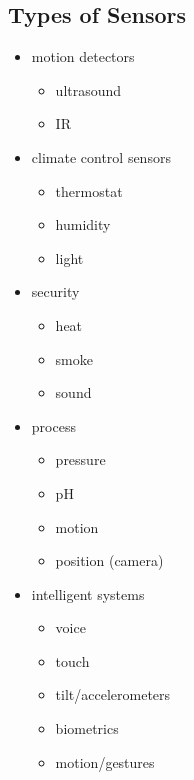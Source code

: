 \documentclass[11pt]{article}
\begin{document}
\subsection{Types of Sensors}
\label{sec:orgc3e558c}
\begin{itemize}
\item motion detectors
\begin{itemize}
\item ultrasound
\item IR
\end{itemize}
\item climate control sensors
\begin{itemize}
\item thermostat
\item humidity
\item light
\end{itemize}
\item security
\begin{itemize}
\item heat
\item smoke
\item sound
\end{itemize}
\item process
\begin{itemize}
\item pressure
\item pH
\item motion
\item position (camera)
\end{itemize}
\item intelligent systems
\begin{itemize}
\item voice
\item touch
\item tilt/accelerometers
\item biometrics
\item motion/gestures
\end{itemize}
\end{itemize}
\end{document}
